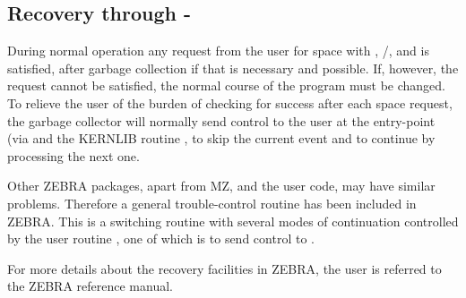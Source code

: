 \subsection{Recovery through -}
\label{SR_ZTELL}%
\par During normal operation any request from the user for space
with , /,
 and  is satisfied,
after garbage collection if that is necessary and possible.
If, however, the request cannot be satisfied,
the normal course of the program must be changed.
To relieve the user of the burden of checking for success
after each space request,
the garbage collector will normally send control to the user at the
entry-point  (via  and the KERNLIB routine
, to skip the current event and to continue
by processing the next one.
\par Other ZEBRA packages, apart from MZ, and the user code, may
have similar problems.
Therefore a general trouble-control routine  has been
included in ZEBRA.
This is a switching routine with several modes of continuation
controlled by the user routine ,
one of which is to send control to .
\par For more details about the recovery facilities in ZEBRA, the user
is referred to the ZEBRA reference manual.
 
